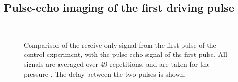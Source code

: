 \subsection{Pulse-echo imaging of the first driving pulse}



\begin{figure}[t]%
  \centering
 \quad
  \\
 \quad
\caption{
    Comparison of the  receive only signal from the first pulse of the control experiment,
    with the pulse-echo signal of the first pulse.
    All signals are averaged over 49 repetitions, and are taken for the pressure \pOOE.
    The delay between the two pulses is shown.
  }
  \label{fig:1st:av:time:comp:control}
\end{figure}

